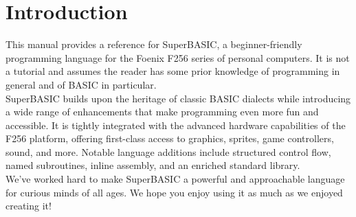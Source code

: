 \chapter*{Introduction}

This manual provides a reference for SuperBASIC, a beginner-friendly programming language for the Foenix F256 series of personal computers. It is not a tutorial and assumes the reader has some prior knowledge of programming in general and of BASIC in particular.\\

SuperBASIC builds upon the heritage of classic BASIC dialects while introducing a wide range of enhancements that make programming even more fun and accessible. It is tightly integrated with the advanced hardware capabilities of the F256 platform, offering first-class access to graphics, sprites, game controllers, sound, and more. Notable language additions include structured control flow, named subroutines, inline assembly, and an enriched standard library. \\

We’ve worked hard to make SuperBASIC a powerful and approachable language for curious minds of all ages. We hope you enjoy using it as much as we enjoyed creating it!

